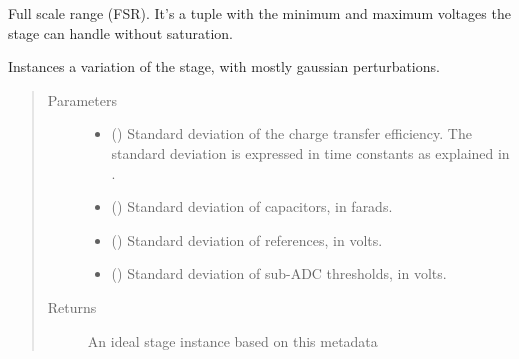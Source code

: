 \documentclass[letterpaper,10pt,english]{sphinxmanual}
\begin{document}
\begin{fulllineitems}
\begin{fulllineitems}
\label{\detokenize{gen:calib.gen.StageMeta.fsr}}
Full scale range (FSR). It’s a tuple with the minimum and maximum
voltages the stage can handle without saturation.

\end{fulllineitems}


\begin{fulllineitems}
\label{\detokenize{gen:calib.gen.StageMeta.generate_gaussian}}
Instances a variation of the stage, with mostly gaussian perturbations.
\begin{quote}\begin{description}
\item[{Parameters}] \leavevmode\begin{itemize}
\item {} 
 () \textendash{} Standard deviation of the charge transfer efficiency. The
standard deviation is expressed in time constants as explained in
{\hyperref[\detokenize{gen:calib.gen.eff_random}]{}}.

\item {} 
 () \textendash{} Standard deviation of capacitors, in farads.

\item {} 
 () \textendash{} Standard deviation of references, in volts.

\item {} 
 () \textendash{} Standard deviation of sub-ADC thresholds, in volts.

\end{itemize}

\item[{Returns}] \leavevmode
An ideal stage instance based on this metadata


\end{description}
\end{quote}
\end{fulllineitems}
\end{fulllineitems}
\end{document}
